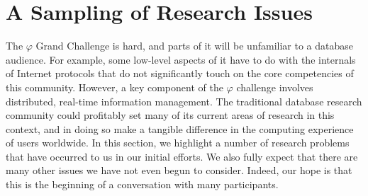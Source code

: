 \documentclass{acm_proc_article-sp}
\def\philogo{{\large $\varphi$}\xspace}
\begin{document}
% 
% 
% 
\section{A Sampling of Research Issues} The \philogo Grand Challenge is hard, and parts of it will be unfamiliar to a database audience. For example, some low-level aspects of it have to do with the internals of Internet protocols that do not significantly touch on the core competencies of this community. However, a key component of the \philogo challenge involves distributed, real-time information management. The traditional database research community could profitably set many of its current areas of research in this context, and in doing so make a tangible difference in the computing experience of users worldwide. In this section, we highlight a number of research problems that have occurred to us in our initial efforts. We also fully expect that there are many other issues we have not even begun to consider. Indeed, our hope is that this is the beginning of a conversation with many participants.
\end{document}
